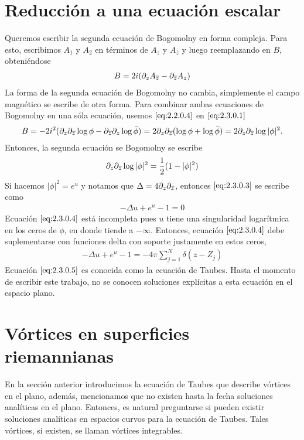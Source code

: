 \section{Reducción a una ecuación escalar}
\label{sec: 2.3}

Queremos escribir la segunda ecuación de Bogomolny en forma compleja. Para esto, escribimos $A_1$ y $A_2$ en términos de $A_z$ y $A_{\overline z}$ y luego reemplazando en $B$, obteniéndose
\begin{align}
    B = 2i(\partial_z A_{\overline z}-\partial_{\overline z} A_z)\label{eq:2.3.0.1}
\end{align}
La forma de la segunda ecuación de Bogomolny no cambia, simplemente el campo magnético se escribe de otra forma. Para combinar ambas ecuaciones de Bogomolny en una sóla ecuación, usemos $\eqref{eq:2.2.0.4}$ en $\eqref{eq:2.3.0.1}$
\begin{align}
    B = -2i^2(\partial_z \partial_{\overline z}\log\phi-\partial_{\overline z}\partial_z\log\bar\phi) = 2\partial_z\partial_{\overline z}(\log\phi+\log\bar\phi) = 2\partial_z\partial_{\overline z}\log|\phi|^2. \label{eq:2.3.0.2}
\end{align}
Entonces, la segunda ecuación se Bogomolny se escribe
\begin{align}
    \partial_z\partial_{\overline z}\log|\phi|^2 = \frac{1}{2}(1-|\phi|^2) \label{eq:2.3.0.3}
\end{align}
Si hacemos $|\phi|^2 = e^{u}$ y notamos que $\Delta=4\partial_z\partial_{\overline z}$, entonces $\eqref{eq:2.3.0.3}$ se escribe como
\begin{align}
    -\Delta u+e^u-1 =0 \label{eq:2.3.0.4}
\end{align}
Ecuación $\eqref{eq:2.3.0.4}$ está incompleta pues $u$ tiene una singularidad logarítmica en los ceros de $\phi$, en donde tiende a $-\infty$. Entonces, ecuación $\eqref{eq:2.3.0.4}$ debe suplementarse con funciones delta con soporte justamente en estos ceros,
\begin{align}
    -\Delta u+e^u-1 =-4\pi\sum_{j=1}^N\delta(z-Z_j)\label{eq:2.3.0.5}
\end{align}
Ecuación $\eqref{eq:2.3.0.5}$ es conocida como la ecuación de Taubes. Hasta el momento de escribir este trabajo, no se conocen soluciones explícitas a esta ecuación en el espacio plano.

\section{Vórtices en superficies riemannianas}

En la sección anterior introducimos la ecuación de Taubes que describe vórtices en el plano, además, mencionamos que no existen hasta la fecha soluciones analíticas en el plano. Entonces, es natural preguntarse si pueden existir soluciones analíticas en espacios curvos para la ecuación de Taubes. Tales vórtices, si existen, se llaman vórtices integrables.

